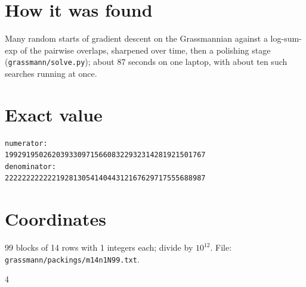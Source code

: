 \documentclass[11pt,a4paper]{article}
\begin{document}
\section{How it was found}
Many random starts of gradient descent on the Grassmannian against a log-sum-exp of the pairwise overlaps, sharpened over time, then a polishing stage (\texttt{grassmann/solve.py}); about 87 seconds on one laptop, with about ten such searches running at once.


\appendix
\section{Exact value}
{\small
\begin{verbatim}
numerator:
19929195026203933097156608322932314281921501767
denominator:
22222222222219281305414044312167629717555688987
\end{verbatim}}

\section{Coordinates}
99 blocks of 14 rows with 1 integers each; divide by $10^{12}$. File: \texttt{grassmann/packings/m14n1N99.txt}.
{\tiny
\begin{multicols}{4}
\end{multicols}}
\end{document}
